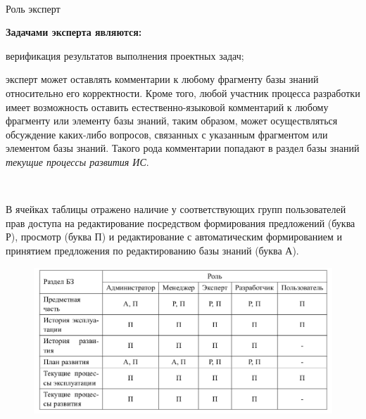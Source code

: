 \begin{frame}{\\Роль эксперт}
	\begin{SCn}
		\textbf{Задачами эксперта являются:}
			\begin{textitemize}
				\item верификация результатов выполнения проектных задач;
				\item эксперт может оставлять комментарии к любому фрагменту базы знаний относительно его корректности. Кроме того, любой участник процесса разработки имеет возможность оставить естественно-языковой комментарий к любому фрагменту или элементу базы знаний, таким образом, может осуществляться обсуждение каких-либо вопросов, связанных с указанным фрагментом или элементом базы знаний. Такого рода комментарии попадают в раздел базы знаний \textit{текущие процессы развития ИС}.
			\end{textitemize}
	\end{SCn}
\end{frame}

\begin{frame}{\\}
	\begin{SCn}
		В ячейках таблицы отражено наличие	у соответствующих групп пользователей прав доступа на редактирование посредством формирования предложений (буква Р), просмотр (буква П) и редактирование с автоматическим формированием и принятием предложения по редактированию базы знаний (буква А).
		\begin{figure}[H]
			\includegraphics[scale=0.3]{./figures/sd_kb_develop_methods/table.png}
		\end{figure}
	\end{SCn}
\end{frame}

